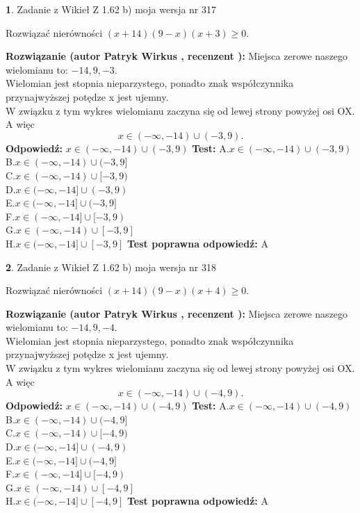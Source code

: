 \documentclass[12pt, a4paper]{article}
\theoremstyle{definition} %
\newtheorem{zad}{}
\newcommand{\zadStart}[1]{\begin{zad}#1\newline}
\newcommand{\zadStop}{\end{zad}}
\newcommand{\rozwStart}[2]{\noindent \textbf{Rozwiązanie (autor #1 , recenzent #2): }\newline}
\newcommand{\rozwStop}{\newline}
\newcommand{\odpStart}{\noindent \textbf{Odpowiedź:}\newline}
\newcommand{\odpStop}{\newline}
\newcommand{\testStart}{\noindent \textbf{Test:}\newline}
\newcommand{\testStop}{\newline}
\newcommand{\kluczStart}{\noindent \textbf{Test poprawna odpowiedź:}\newline}
\newcommand{\kluczStop}{\newline}
\begin{document}
\zadStart{Zadanie z Wikieł Z 1.62 b) moja wersja nr 317}

Rozwiązać nierówności $(x+14)(9-x)(x+3)\ge0$.
\zadStop
\rozwStart{Patryk Wirkus}{}
Miejsca zerowe naszego wielomianu to: $-14, 9, -3$.\\
Wielomian jest stopnia nieparzystego, ponadto znak współczynnika przy\linebreak najwyższej potędze x jest ujemny.\\ W związku z tym wykres wielomianu zaczyna się od lewej strony powyżej osi OX. A więc $$x \in (-\infty,-14) \cup (-3,9).$$
\rozwStop
\odpStart
$x \in (-\infty,-14) \cup (-3,9)$
\odpStop
\testStart
A.$x \in (-\infty,-14) \cup (-3,9)$\\
B.$x \in (-\infty,-14) \cup (-3,9]$\\
C.$x \in (-\infty,-14) \cup [-3,9)$\\
D.$x \in (-\infty,-14] \cup (-3,9)$\\
E.$x \in (-\infty,-14] \cup (-3,9]$\\
F.$x \in (-\infty,-14] \cup [-3,9)$\\
G.$x \in (-\infty,-14) \cup [-3,9]$\\
H.$x \in (-\infty,-14] \cup [-3,9]$
\testStop
\kluczStart
A
\kluczStop



\zadStart{Zadanie z Wikieł Z 1.62 b) moja wersja nr 318}

Rozwiązać nierówności $(x+14)(9-x)(x+4)\ge0$.
\zadStop
\rozwStart{Patryk Wirkus}{}
Miejsca zerowe naszego wielomianu to: $-14, 9, -4$.\\
Wielomian jest stopnia nieparzystego, ponadto znak współczynnika przy\linebreak najwyższej potędze x jest ujemny.\\ W związku z tym wykres wielomianu zaczyna się od lewej strony powyżej osi OX. A więc $$x \in (-\infty,-14) \cup (-4,9).$$
\rozwStop
\odpStart
$x \in (-\infty,-14) \cup (-4,9)$
\odpStop
\testStart
A.$x \in (-\infty,-14) \cup (-4,9)$\\
B.$x \in (-\infty,-14) \cup (-4,9]$\\
C.$x \in (-\infty,-14) \cup [-4,9)$\\
D.$x \in (-\infty,-14] \cup (-4,9)$\\
E.$x \in (-\infty,-14] \cup (-4,9]$\\
F.$x \in (-\infty,-14] \cup [-4,9)$\\
G.$x \in (-\infty,-14) \cup [-4,9]$\\
H.$x \in (-\infty,-14] \cup [-4,9]$
\testStop
\kluczStart
A
\kluczStop
\end{document}
